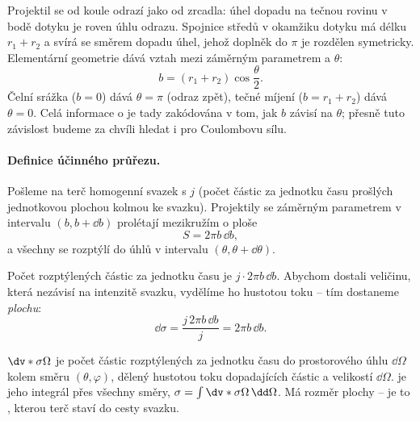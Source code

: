 Projektil se od koule odrazí jako od zrcadla: úhel dopadu na tečnou rovinu v bodě dotyku je roven úhlu odrazu. Spojnice středů v okamžiku dotyku má délku $r_1+r_2$ a svírá se směrem dopadu úhel, jehož doplněk do $\pi$ je rozdělen symetricky. Elementární geometrie dává vztah mezi záměrným parametrem a  $\theta$:
\begin{equation}
  b = (r_1+r_2)\cos\frac{\theta}{2}.
\end{equation}
Čelní srážka ($b=0$) dává $\theta=\pi$ (odraz zpět), tečné míjení ($b=r_1+r_2$) dává $\theta=0$. Celá informace o  je tady zakódována v tom, jak $b$ závisí na $\theta$; přesně tuto závislost budeme za chvíli hledat i pro Coulombovu sílu.

\paragraph{Definice účinného průřezu.}
Pošleme na terč homogenní svazek s  $j$ (počet částic za jednotku času prošlých jednotkovou plochou kolmou ke svazku). Projektily se záměrným parametrem v intervalu $(b, b+\dd b)$ prolétají mezikružím o ploše
\[
  S = 2\pi b\,\dd b ,
\]
a všechny se rozptýlí do úhlů v intervalu $(\theta,\theta+\dd\theta)$.

\begin{center}
\end{center}

Počet rozptýlených částic za jednotku času je $j\cdot 2\pi b\,\dd b$. Abychom dostali veličinu, která nezávisí na intenzitě svazku, vydělíme ho hustotou toku -- tím dostaneme \emph{plochu}:
\begin{equation}
  \dd\sigma = \frac{j\, 2\pi b\, \dd b}{j} = 2\pi b\,\dd b .
\end{equation}

\begin{definice}
 $\dv*{\sigma}{\Omega}$ je počet částic rozptýlených za jednotku času do prostorového úhlu $\dd\Omega$ kolem směru $(\theta,\varphi)$, dělený hustotou toku dopadajících částic a velikostí $\dd\Omega$.  je jeho integrál přes všechny směry, $\sigma = \int \dv*{\sigma}{\Omega}\,\dd\Omega$. Má rozměr plochy -- je to , kterou terč staví do cesty svazku.
\end{definice}

